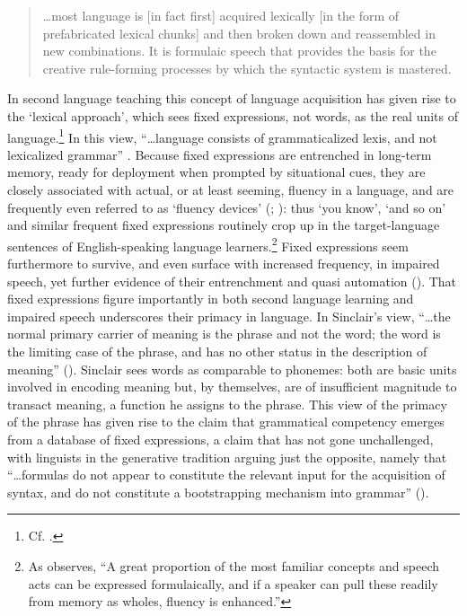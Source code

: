 \documentclass[output=paper]{langsci/langscibook}
\begin{document}
\begin{quote}
    …most language is [in fact first] acquired lexically [in the form of prefabricated lexical chunks] and then broken down and reassembled in new combinations. It is formulaic speech that provides the basis for the creative rule-forming processes by which the syntactic system is mastered. \citep[174]{mackenzie_improvisation_2000}
\end{quote}

In second language teaching this concept of language acquisition has given rise to the ‘lexical approach’, which sees fixed expressions, not words, as the real units of language.\footnote{ \textrm{Cf. \citealt{lewis_lexical_1993}.}} In this view, “…language consists of grammaticalized lexis, and not lexicalized grammar” \citep[63]{MacKenzie2000b}. Because fixed expressions are entrenched in long-term memory, ready for deployment when prompted by situational cues, they are closely associated with actual, or at least seeming, fluency in a language, and are frequently even referred to as ‘fluency devices’ (\citealt[174]{mackenzie_improvisation_2000}; \citealt[3]{wood_formulaic_2002}): thus ‘you know’, ‘and so on’ and similar frequent fixed expressions routinely crop up in the target-language sentences of English-speaking language learners.\footnote{ \textrm{As \citet[7]{wood_formulaic_2002} observes, “A great proportion of the most familiar concepts and speech acts can be expressed formulaically, and if a speaker can pull these readily from memory as wholes, fluency is enhanced.”}} Fixed expressions seem furthermore to survive, and even surface with increased frequency, in impaired speech, yet further evidence of their entrenchment and quasi automation (\citealt[xxiv]{granger_phraseology:_2008}). That fixed expressions figure importantly in both second language learning and impaired speech underscores their primacy in language. In Sinclair’s view, “…the normal primary carrier of meaning is the phrase and not the word; the word is the limiting case of the phrase, and has no other status in the description of meaning” (\citeyear[409]{granger_phrase_2008}). Sinclair sees words as comparable to phonemes: both are basic units involved in encoding meaning but, by themselves, are of insufficient magnitude to transact meaning, a function he assigns to the phrase. This view of the primacy of the phrase has given rise to the claim that grammatical competency emerges from a database of fixed expressions, a claim that has not gone unchallenged, with linguists in the generative tradition arguing just the opposite, namely that “…formulas do not appear to constitute the relevant input for the acquisition of syntax, and do not constitute a bootstrapping mechanism into grammar” (\citealt[85]{bardovi-harlig_unconventional_2017}).
\end{document}
